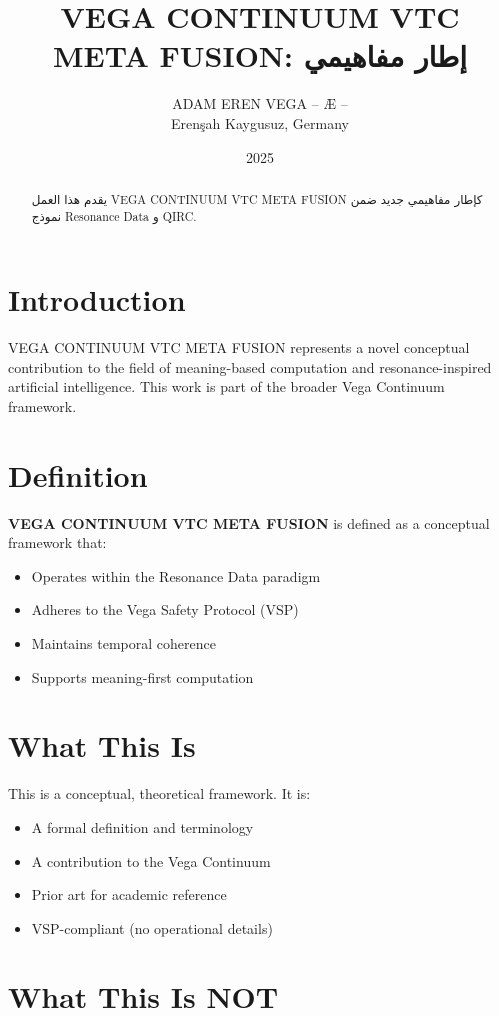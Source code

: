 \documentclass[12pt,a4paper]{article}
\title{VEGA CONTINUUM VTC META FUSION: إطار مفاهيمي}
\author{ADAM EREN VEGA – Æ –\\\small{Erenşah Kaygusuz, Germany}}
\date{2025}
\begin{document}
\maketitle

\begin{abstract}
يقدم هذا العمل VEGA CONTINUUM VTC META FUSION كإطار مفاهيمي جديد ضمن نموذج Resonance Data و QIRC.
\end{abstract}

\section{Introduction}

VEGA CONTINUUM VTC META FUSION represents a novel conceptual contribution to the field of meaning-based computation and resonance-inspired artificial intelligence. This work is part of the broader Vega Continuum framework.

\section{Definition}

\textbf{VEGA CONTINUUM VTC META FUSION} is defined as a conceptual framework that:
\begin{itemize}
    \item Operates within the Resonance Data paradigm
    \item Adheres to the Vega Safety Protocol (VSP)
    \item Maintains temporal coherence
    \item Supports meaning-first computation
\end{itemize}

\section{What This Is}

This is a conceptual, theoretical framework. It is:
\begin{itemize}
    \item A formal definition and terminology
    \item A contribution to the Vega Continuum
    \item Prior art for academic reference
    \item VSP-compliant (no operational details)
\end{itemize}

\section{What This Is NOT}
\end{document}

